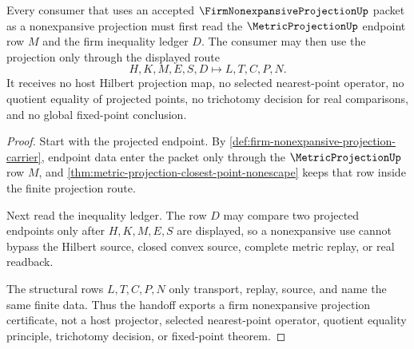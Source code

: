\begin{theorem}\label{thm:firm-nonexpansive-projection-metric-projection-handoff}
Every consumer that uses an accepted $\FirmNonexpansiveProjectionUp$ packet as a nonexpansive projection must first read the $\MetricProjectionUp$ endpoint row $M$ and the firm inequality ledger $D$. The consumer may then use the projection only through the displayed route
$$
H,K,M,E,S,D \longmapsto L,T,C,P,N .
$$
It receives no host Hilbert projection map, no selected nearest-point operator, no quotient equality of projected points, no trichotomy decision for real comparisons, and no global fixed-point conclusion.
\end{theorem}
\begin{proof}
Start with the projected endpoint. By \autoref{def:firm-nonexpansive-projection-carrier}, endpoint data enter the packet only through the $\MetricProjectionUp$ row $M$, and \autoref{thm:metric-projection-closest-point-nonescape} keeps that row inside the finite projection route.

Next read the inequality ledger. The row $D$ may compare two projected endpoints only after $H,K,M,E,S$ are displayed, so a nonexpansive use cannot bypass the Hilbert source, closed convex source, complete metric replay, or real readback.

The structural rows $L,T,C,P,N$ only transport, replay, source, and name the same finite data. Thus the handoff exports a firm nonexpansive projection certificate, not a host projector, selected nearest-point operator, quotient equality principle, trichotomy decision, or fixed-point theorem.
\end{proof}



